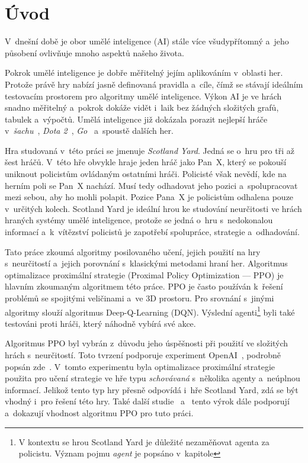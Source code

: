 \newtheorem{definition}{\textbf{Definice}}

\chapter{Úvod}
\label{ch:uvod}

V~dnešní době je obor umělé inteligence (AI) stále více všudypřítomný a~jeho působení ovlivňuje mnoho aspektů našeho života.

Pokrok umělé inteligence je dobře měřitelný jejím aplikováním v~oblasti her.
Protože právě hry nabízí jasně definovaná pravidla a~cíle, čímž se stávají ideálním testovacím prostorem pro algoritmy umělé inteligence.
Výkon AI je ve hrách snadno měřitelný a~pokrok dokáže vidět i~laik bez žádných složitých grafů, tabulek a~výpočtů.
Umělá inteligence již dokázala porazit nejlepší hráče v~\textit{šachu}~\cite{DeepBlue}, \textit{Dota 2}~\cite{Dota2}, \textit{Go}~\cite{AlphaGo} a~spoustě dalších her.


Hra studovaná v~této práci se jmenuje \emph{Scotland Yard}.
Jedná se o~hru pro tři až šest hráčů.
V~této hře obvykle hraje jeden hráč jako Pan~X, který se pokouší uniknout policistům ovládaným ostatními hráči.
Policisté však nevědí, kde na herním poli se Pan~X nachází.
Musí tedy odhadovat jeho pozici a~spolupracovat mezi sebou, aby ho mohli polapit.
Pozice Pana~X je policistům odhalena pouze v~určitých kolech.
Scotland Yard je ideální hrou ke studování neurčitosti ve hrách hraných systémy umělé inteligence, protože se jedná o~hru s~nedokonalou informací a~k~vítězství policistů je zapotřebí spolupráce, strategie a~odhadování.

Tato práce zkoumá algoritmy posilovaného učení, jejich použití na hry s~neurčitostí a~jejich porovnání s~klasickými metodami hraní her.
Algoritmus optimalizace proximální strategie (Proximal Policy Optimization --- PPO) je hlavním zkoumaným algoritmem této práce.
PPO je často používán k~řešení problémů se spojitými veličinami a~ve 3D prostoru.
Pro srovnání s~jinými algoritmy slouží algoritmus Deep-Q-Learning (DQN).
Výslední agenti\footnote[1]{V kontextu se hrou Scotland Yard je důležité nezaměňovat agenta za policistu.
Význam pojmu \emph{agent} je popsáno v~kapitole } byli také testováni proti hráči, který náhodně vybírá své akce.

Algoritmus PPO byl vybrán z~důvodu jeho úspěšnosti při použití ve složitých hrách s~neurčitostí.
Toto tvrzení podporuje experiment OpenAI~\cite{PPO_Hide_Seek_page}, podrobně popsán zde~\cite{PPO_Hide_Seek_paper}.
V~tomto experimentu byla optimalizace proximální strategie použita pro učení strategie ve hře typu \textit{schovávaná} s~několika agenty a~neúplnou informací.
Jelikož tento typ hry přesně odpovídá i~hře Scotland Yard, zdá se být vhodný i~pro řešení této hry.
Také další studie~\cite{Manille} a~\cite{Dota2} tento výrok dále podporují a~dokazují vhodnost algoritmu PPO pro tuto práci.

